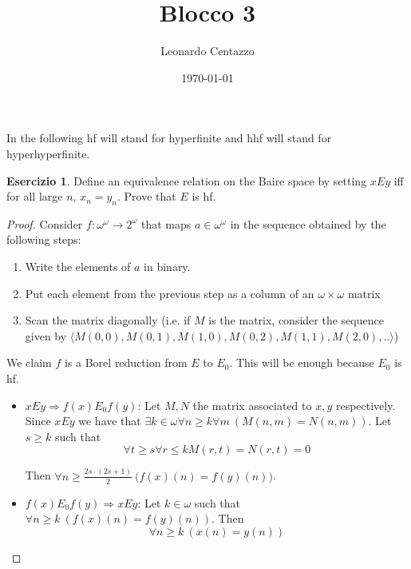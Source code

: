 \documentclass[a4paper,12pt]{article}
\title{Blocco 3}
\author{Leonardo Centazzo}
\date{\today}
\theoremstyle{plain}
\theoremstyle{definition}
\newtheorem{esercizio}{Esercizio}
\theoremstyle{remark}
\begin{document}
\maketitle

In the following hf will stand for hyperfinite and hhf will stand for hyperhyperfinite.

\begin{esercizio}

	Define an equivalence relation on the Baire space by setting
	$x E y$ iff for all large $n$, $x_n = y_n$. Prove that $E$ is hf.

\end{esercizio}

\begin{proof}

	Consider $f: \omega^{\omega} \to 2^{\omega}$ that maps $a \in \omega^{\omega}$ in the sequence obtained by the following steps:
	\begin{enumerate}
		\item Write the elements of $a$ in binary. 
		\item Put each element from the previous step as a column of an $\omega \times \omega$ matrix
		\item Scan the matrix diagonally (i.e. if $M$ is the matrix, consider the sequence given by
			$\langle M(0,0), M(0,1), M(1,0), M(0,2), M(1,1), M(2,0),..\rangle$)
	\end{enumerate}

	We claim $f$ is a Borel reduction from $E$ to $E_0$. This will be enough because $E_0$ is hf.
	\begin{itemize}
		\item $x E y \Rightarrow f(x) E_0 f(y)$:
			Let $M,N$ the matrix associated to $x,y$ respectively.
			Since $x E y$ we have that $\exists k \in \omega \forall n \geq k \forall m \ (M(n,m) = N(n,m))$.
			Let $s \geq k$ such that 
			\[
				\forall t \geq s \forall r \leq k M(r,t) = N(r,t) = 0
			\]

			Then $\forall n \geq \frac{2s \cdot (2s +1)}{2} \ \big(f(x)(n) = f(y)(n)\big)$.

		\item $f(x) E_0 f(y) \Rightarrow x E y$:
			Let $k \in \omega$ such that $\forall n \geq k \ (f(x)(n) = f(y)(n))$. 
			Then 
			\[
				\forall n \geq k \ (x(n) = y(n))
			\]
	\end{itemize}

\end{proof}
\end{document}
